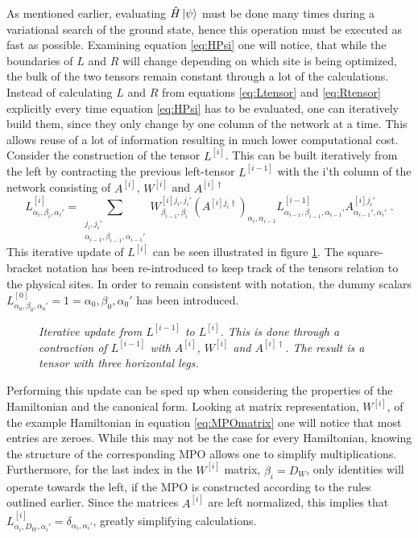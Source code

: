 As mentioned earlier, evaluating $\hat{H} \ket{\psi}$ must be done many times during a variational search of the ground state, hence this operation must be executed as fast as possible. Examining equation \ref{eq:HPsi} one will notice, that while the boundaries of $L$ and $R$ will change depending on which site is being optimized, the bulk of the two tensors remain constant through a lot of the calculations. Instead of calculating $L$ and $R$ from equations \ref{eq:Ltensor} and \ref{eq:Rtensor} explicitly every time equation \ref{eq:HPsi} has to be evaluated, one can iteratively build them, since they only change by one column of the network at a time. This allows reuse of a lot of information resulting in much lower computational cost.\\
Consider the construction of the tensor $L^{[i]}$. This can be built iteratively from the left by contracting the previous left-tensor $L^{[i-1]}$ with the i'th column of the network consisting of $A^{[i]}$, $W^{[i]}$ and $A^{[i] \dag}$
\begin{equation}
	L_{\alpha_i , \beta_i , \alpha_i '}^{[i]} = \sum_{\substack{ j_i , j_i ' \\ \alpha_{i-1} , \beta_{i-1} , \alpha_{i-1} '}} W_{\beta_{i-1} , \beta_i}^{[i] j_i , j_i '} \left( A^{[i] j_i \dag} \right)_{\alpha_i , \alpha_{i-1}} L_{\alpha_{i-1} , \beta_{i-1} , \alpha_{i-1} '}^{[i-1]} A_{\alpha_{i-1} ' , \alpha_i '}^{[i] j_i '} \; .
\end{equation}
This iterative update of $L^{[i]}$ can be seen illustrated in figure \ref{fig:buildLTensor}. The square-bracket notation has been re-introduced to keep track of the tensors relation to the physical sites. In order to remain consistent with notation, the dummy scalars $L_{\alpha_0 , \beta_0 , \alpha_0 '}^{[0]}  = 1  = \alpha_0 , \beta_0 , \alpha_0 '$ has been introduced. 
\begin{figure}[h!]
	\centering
	
	\caption{\textit{Iterative update from $L^{[i-1]}$ to $L^{[i]}$. This is done through a contraction of $L^{[i-1]}$ with $A^{[i]}$, $W^{[i]}$ and $A^{[i] \dag}$. The result is a tensor with three horizontal legs.}}
	\label{fig:buildLTensor}
\end{figure}
Performing this update can be sped up when considering the properties of the Hamiltonian and the canonical form. Looking at matrix representation, $W^{[i]}$, of the example Hamiltonian in equation \ref{eq:MPOmatrix} one will notice that most entries are zeroes. While this may not be the case for every Hamiltonian, knowing the structure of the corresponding MPO allows one to simplify multiplications. Furthermore, for the last index in the $W^{[i]}$ matrix, $\beta_i = D_W$, only identities will operate towards the left, if the MPO is constructed according to the rules outlined earlier. Since the matrices $A^{[i]}$ are left normalized, this implies that $L_{\alpha_i , D_W, \alpha_i '}^{[i]} = \delta_{\alpha_i , \alpha_i '}$, greatly simplifying calculations.\\
